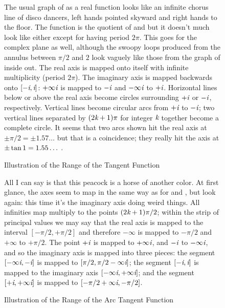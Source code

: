 \begin{figure}
\caption{Illustration of the Range of the Tangent Function}
\small\noindent
The usual graph of  as a real function looks like an infinite chorus
line of disco dancers, left hands pointed skyward and right hands to the floor.
The  function is the quotient of  and 
but it doesn't much look like either except for having period $2\pi$.
This goes for the complex plane as well, although the swoopy loops produced
from the annulus between $\pi/2$ and $2$ look vaguely like
those from the graph of  inside out.
The real axis is mapped onto itself with infinite multiplicity (period $2\pi$).
The imaginary axis is mapped backwards onto $[-\emph{i},\emph{i}]$:
$+\infty \emph{i}$ is mapped to $-\emph{i}$ and $-\infty \emph{i}$ to $+\emph{i}$.
Horizontal lines below or above the real axis
become circles surrounding $+\emph{i}$ or $-\emph{i}$, respectively.
Vertical lines become circular arcs from $+\emph{i}$ to $-\emph{i}$;
two vertical lines separated by $(2\emph{k}+1)\pi$ for integer $\emph{k}$
together become a complete circle.  It seems that two arcs
shown hit the real axis at $\pm\pi/2=\pm 1.57\ldots$ but that is a coincidence;
they really hit the axis at $\pm\tan 1= 1.55\ldots\,\hbox{}$.
\end{figure}

\clearpage

\begin{figure}
\caption{Illustration of the Range of the Arc Tangent Function}
\small\noindent
All I can say is that this peacock is a horse of another color.
At first glance, the axes seem to map in the same way as for  and
, but look again: this time it's the imaginary axis doing weird things.
All infinities map multiply to the points
$(2\emph{k}+1)\pi/2$; within the strip of principal values we may say that
the real axis is mapped to the interval $[-\pi/2,+\pi/2]$ and therefore
$-\infty$ is mapped to $-\pi/2$ and $+\infty$ to $+\pi/2$.
The point $+\emph{i}$ is mapped to $+\infty \emph{i}$, and $-\emph{i}$ to $-\infty \emph{i}$, and
so the imaginary axis is mapped into three pieces: the segment
$[-\infty \emph{i},-\emph{i}]$ is mapped to $[\pi/2,\pi/2-\infty \emph{i}]$; the segment
$[-\emph{i},\emph{i}]$ is mapped to the imaginary axis $[-\infty \emph{i},+\infty \emph{i}]$; and the segment
$[+\emph{i},+\infty \emph{i}]$ is mapped to $[-\pi/2+\infty \emph{i},-\pi/2]$.
\end{figure}

